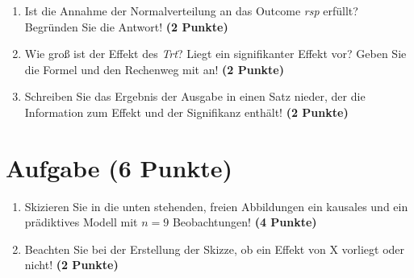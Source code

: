 \documentclass[a4paper, 10pt]{scrartcl}\usepackage[]{graphicx}\usepackage[]{xcolor}
\begin{document}
\begin{enumerate}
\item Ist die Annahme der Normalverteilung an das Outcome \textit{rsp} erf{\"u}llt?
  Begr{\"u}nden Sie die Antwort! \textbf{(2 Punkte)}
\item Wie gro{\ss} ist der Effekt des \textit{Trt}? Liegt ein signifikanter
  Effekt vor? Geben Sie die Formel und den Rechenweg mit an! \textbf{(2 Punkte)}
\item Schreiben Sie das Ergebnis der \Rlogo Ausgabe in einen Satz nieder, der die
  Information zum Effekt und der Signifikanz enth{\"a}lt! \textbf{(2 Punkte)} 
\end{enumerate}
 
\clearpage

\section{Aufgabe \hfill (6 Punkte)}



\begin{enumerate}
\item Skizieren Sie in die unten stehenden, freien Abbildungen ein kausales
  und ein pr{\"a}diktives Modell mit $n = 9$
  Beobachtungen! \textbf{(4 Punkte)}
\item Beachten Sie bei der Erstellung der Skizze, ob ein Effekt von X
  vorliegt oder nicht! \textbf{(2 Punkte)}
\end{enumerate}
\end{document}
